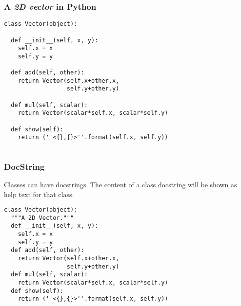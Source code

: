 \begin{frame}[fragile]\frametitle{A \emph{2D vector} in Python}
\begin{lstlisting}
class Vector(object):
 
  def __init__(self, x, y):
    self.x = x
    self.y = y
    
  def add(self, other):
    return Vector(self.x+other.x,
                  self.y+other.y)
                  
  def mul(self, scalar):
    return Vector(scalar*self.x, scalar*self.y)
    
  def show(self):
    return (''<{},{}>''.format(self.x, self.y))
    
\end{lstlisting}
\end{frame}



\begin{frame}[fragile]\frametitle{DocString}
      Classes can have docstrings.
      The content of a class docstring will be shown as help text for
      that class.
\begin{lstlisting}
class Vector(object):
  """A 2D Vector."""
  def __init__(self, x, y):
    self.x = x
    self.y = y
  def add(self, other):
    return Vector(self.x+other.x,
                  self.y+other.y)
  def mul(self, scalar):
    return Vector(scalar*self.x, scalar*self.y)
  def show(self):
    return (''<{},{}>''.format(self.x, self.y))
\end{lstlisting}

\end{frame}


